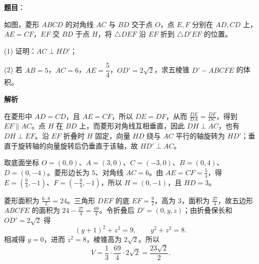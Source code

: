 \begin{answer}

\textbf{题目}：

如图，菱形 $ABCD$ 的对角线 $AC$ 与 $BD$ 交于点 $O$，点 $E,F$ 分别在 $AD,CD$ 上，$AE=CF$，$EF$ 交 $BD$ 于点 $H$，将 $\triangle DEF$ 沿 $EF$ 折到 $\triangle D'EF$ 的位置。
\nopagebreak[4]
\begin{center}\end{center}
\nopagebreak[4]
   (1) 证明：$AC\perp HD'$；

   (2) 若 $AB=5$，$AC=6$，$AE=\dfrac54$，$OD'=2\sqrt2$，求五棱锥 $D'-ABCFE$ 的体积。

\textbf{解析}


在菱形中 $AD=CD$，且 $AE=CF$，所以 $DE=DF$，从而
$\frac{DE}{DA}=\frac{DF}{DC}$，得到 $EF\parallel AC$。点 $H$ 在 $BD$ 上，而菱形对角线互相垂直，因此 $DH\perp AC$，也有 $DH\perp EF$。沿 $EF$ 折叠时 $H$ 固定，向量 $HD$ 绕与 $AC$ 平行的轴旋转为 $HD'$；垂直于旋转轴的向量旋转后仍垂直于该轴，故 $HD'\perp AC$。


取底面坐标 $O=(0,0)$、$A=(3,0)$、$C=(-3,0)$、$B=(0,4)$、$D=(0,-4)$。菱形边长为 $5$、对角线 $AC=6$。由 $AE=CF=\frac54$，得 $E=(\frac94,-1)$、$F=(-\frac94,-1)$，所以 $H=(0,-1)$，且 $HD=3$。

菱形面积为 $\frac{6\cdot8}{2}=24$。三角形 $DEF$ 的底 $EF=\frac92$，高为 $3$，面积为 $\frac{27}{4}$，故五边形 $ABCFE$ 的面积为 $24-\frac{27}{4}=\frac{69}{4}$。令折叠后 $D'=(0,y,z)$；由折叠保长和 $OD'=2\sqrt2$ 得
\nopagebreak[4]
\[
(y+1)^2+z^2=9,\qquad y^2+z^2=8.
\]
相减得 $y=0$，进而 $z^2=8$，棱锥高为 $2\sqrt2$。所以
\nopagebreak[4]
\[
V=\frac13\cdot\frac{69}{4}\cdot2\sqrt2=\frac{23\sqrt2}{2}.
\]



\end{answer}
